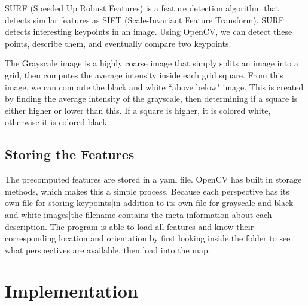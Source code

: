 \documentclass[a4paper,11pt]{article}
\begin{document}
SURF (Speeded Up Robust Features) is a feature detection algorithm that detects similar features as SIFT (Scale-Invariant Feature Transform). SURF detects interesting keypoints in an image. Using OpenCV, we can detect these points, describe them, and eventually compare two keypoints.

The Grayscale image is a highly coarse image that simply splits an image into a grid, then computes the average intensity inside each grid square. From this image, we can compute the black and white ``above below" image. This is created by finding the average intensity of the grayscale, then determining if a square is either higher or lower than this. If a square is higher, it is colored white, otherwise it is colored black.

  \subsection{Storing the Features}
The precomputed features are stored in a yaml file. OpenCV has built in storage methods, which makes this a simple process. Because each perspective has its own file for storing keypoints|in addition to its own file for grayscale and black and white images|the filename contains the meta information about each description. The program is able to load all features and know their corresponding location and orientation by first looking inside the folder to see what perspectives are available, then load into the map.

  \section{Implementation}
   
\end{document}
